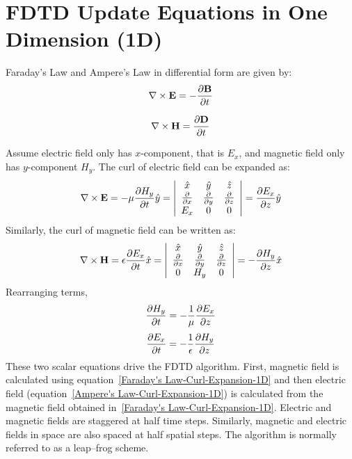 \documentclass[10pt,A4paper]{report}
\begin{document}
\section{FDTD Update Equations in One Dimension (1D)}
Faraday's Law and Ampere's Law in differential form are given by:
\begin{equation}
\centering
\nabla \times \textbf{E} = - \dfrac{\partial \textbf{B}}{\partial t}
\label{Faraday's Law}
\end{equation}

\begin{equation}
\centering
\nabla \times \textbf{H} = \dfrac{\partial \textbf{D}}{\partial t}
\label{Ampere's Law}
\end{equation}

Assume electric field only has $x$-component, that is $E_x$, and magnetic field only has $y$-component $H_y$. The curl of electric field can be expanded as:
\begin{equation}
\centering
\nabla \times \textbf{E} = - \mu \dfrac{\partial H_y}{\partial t} \hat{y} = \left| \begin{array}{ccc} \hat{x} & \hat{y} & \hat{z} \\ \frac{\partial}{\partial x} & \frac{\partial}{\partial y} & \frac{\partial}{\partial z} \\ E_x & 0 & 0 \end{array} \right| = \dfrac{\partial E_x}{\partial z} \hat{y}
\label{Faraday's Law-Curl-Expansion}
\end{equation}
Similarly, the curl of magnetic field can be written as:
\begin{equation}
\centering
\nabla \times \textbf{H} = \epsilon \dfrac{\partial E_x}{\partial t} \hat{x} = \left| \begin{array}{ccc} \hat{x} & \hat{y} & \hat{z} \\ \frac{\partial}{\partial x} & \frac{\partial}{\partial y} & \frac{\partial}{\partial z} \\ 0 & H_y & 0 \end{array} \right| = - \dfrac{\partial H_y}{\partial z} \hat{x}
\label{Ampere's Law-Curl-Expansion}
\end{equation}
Rearranging terms,
\begin{equation}
\centering
\dfrac{\partial H_y}{\partial t} = - \dfrac{1}{\mu} \dfrac{\partial E_x}{\partial z}
\label{Faraday's Law-Curl-Expansion-1D}
\end{equation}
\begin{equation}
\centering
\dfrac{\partial E_x}{\partial t} = - \dfrac{1}{\epsilon} \dfrac{\partial H_y}{\partial z}
\label{Ampere's Law-Curl-Expansion-1D}
\end{equation}
These two scalar equations drive the FDTD algorithm. First, magnetic field is calculated using equation~\ref{Faraday's Law-Curl-Expansion-1D} and then electric field (equation~\ref{Ampere's Law-Curl-Expansion-1D}) is calculated from the magnetic field obtained in~\ref{Faraday's Law-Curl-Expansion-1D}. Electric and magnetic fields are staggered at half time steps. Similarly, magnetic and electric fields in space are also spaced at half spatial steps. The algorithm is normally referred to as a leap--frog scheme.
\end{document}
